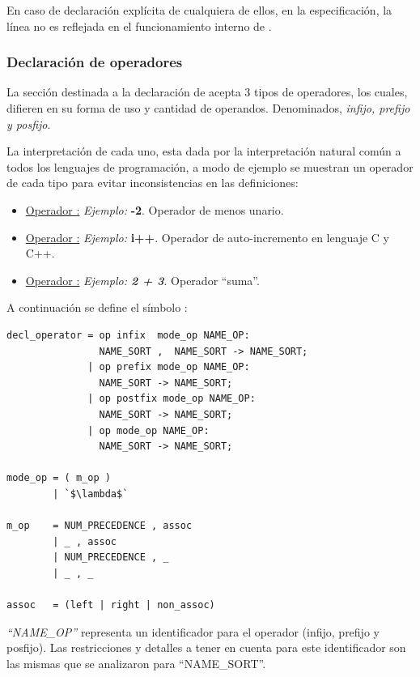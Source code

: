 En caso de declaración explícita de cualquiera de ellos, en la especificación, la línea no es reflejada en el funcionamiento interno de \maggen.

\subsubsection{Declaración de operadores}
La sección destinada a la declaración de  acepta 3 tipos de operadores, los cuales, difieren en su forma de uso y cantidad de operandos. Denominados, \textit{infijo, prefijo y posfijo}. 

La interpretación de cada uno, esta dada por la interpretación natural común a todos los lenguajes de programación, a modo de ejemplo se muestran un operador de cada tipo para evitar inconsistencias en las definiciones:

\begin{itemize}
\item \underline{Operador :} \textit{Ejemplo:} \textbf{-2}. Operador de menos unario. 

\item \underline{Operador :} \textit{Ejemplo:} \textbf{i++}. Operador de auto-incremento en lenguaje C y C++.

\item \underline{Operador :} \textit{Ejemplo: \textbf{2 + 3}}. Operador ``suma''.
\end{itemize}

A continuación se define el símbolo :

\begin{lstlisting}[frame=shadowbox, language=specmag, linewidth=11cm]
decl_operator = op infix  mode_op NAME_OP:
                NAME_SORT ,  NAME_SORT -> NAME_SORT;
              | op prefix mode_op NAME_OP:
                NAME_SORT -> NAME_SORT;
              | op postfix mode_op NAME_OP:
                NAME_SORT -> NAME_SORT;
              | op mode_op NAME_OP:
                NAME_SORT -> NAME_SORT;

mode_op = ( m_op )
        | `$\lambda$`

m_op    = NUM_PRECEDENCE , assoc
        | _ , assoc
        | NUM_PRECEDENCE , _
        | _ , _

assoc   = (left | right | non_assoc)
\end{lstlisting}

\textit{``NAME\_OP''} representa un identificador para el operador (infijo, prefijo y posfijo). Las restricciones y detalles a tener en cuenta para este identificador son las mismas que se analizaron para ``NAME\_SORT''.

